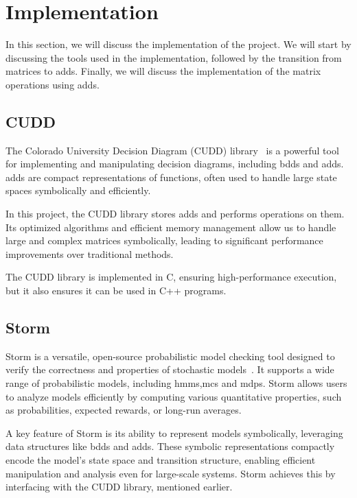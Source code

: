 \section{Implementation}\label{sec:implementation}
In this section, we will discuss the implementation of the project.
We will start by discussing the tools used in the implementation, followed by the transition from matrices to \glspl{add}.
Finally, we will discuss the implementation of the matrix operations using \glspl{add}.

\subsection{CUDD}\label{subsec:cudd}
The Colorado University Decision Diagram (CUDD) library~\cite{somenzi1997cudd} is a powerful tool for implementing and manipulating decision diagrams, including \glspl{bdd} and \glspl{add}. \glspl{add} are compact representations of functions, often used to handle large state spaces symbolically and efficiently.

In this project, the CUDD library stores \glspl{add} and performs operations on them.
Its optimized algorithms and efficient memory management allow us to handle large and complex matrices symbolically, leading to significant performance improvements over traditional methods.

The CUDD library is implemented in C, ensuring high-performance execution, but it also ensures it can be used in C++ programs.

\subsection{Storm}\label{subsec:storm}
Storm is a versatile, open-source probabilistic model checking tool designed to verify the correctness and properties of stochastic models~\cite{hensel2021probabilistic}. It supports a wide range of probabilistic models, including \glspl{hmm},\glspl{mc} and \glspl{mdp}. Storm allows users to analyze models efficiently by computing various quantitative properties, such as probabilities, expected rewards, or long-run averages.

A key feature of Storm is its ability to represent models symbolically, leveraging data structures like \glspl{bdd} and \glspl{add}. These symbolic representations compactly encode the model's state space and transition structure, enabling efficient manipulation and analysis even for large-scale systems. Storm achieves this by interfacing with the CUDD library, mentioned earlier.

